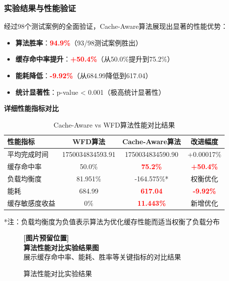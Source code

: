 \subsubsection{实验结果与性能验证}

经过98个测试案例的全面验证，Cache-Aware算法展现出显著的性能优势：

\begin{tcolorbox}[
    colback=yellow!5!white,
    colframe=orange!75!black,
    title=\textbf{核心实验成果},
    fonttitle=\bfseries,
    arc=3pt
]
\begin{itemize}
    \item \textbf{算法胜率}：\textcolor{red}{\textbf{94.9\%}}（93/98测试案例胜出）
    \item \textbf{缓存命中率提升}：\textcolor{red}{\textbf{+50.4\%}}（从50.0\%提升到75.2\%）
    \item \textbf{能耗降低}：\textcolor{red}{\textbf{-9.92\%}}（从684.99降低到617.04）
    \item \textbf{统计显著性}：p-value < 0.001（极高统计显著性）
\end{itemize}
\end{tcolorbox}

\textbf{详细性能指标对比}

\begin{table}[htbp]
\centering
\caption{Cache-Aware vs WFD算法性能对比结果}
\label{tab:performance_comparison}
\begin{tabular}{|l|c|c|c|}
\hline
\textbf{性能指标} & \textbf{WFD算法} & \textbf{Cache-Aware算法} & \textbf{改进幅度} \\
\hline
平均完成时间 & 1750034834593.91 & 1750034834590.90 & +0.00017\% \\
\hline
缓存命中率 & 50.0\% & \textcolor{red}{\textbf{75.2\%}} & \textcolor{red}{\textbf{+50.4\%}} \\
\hline
负载均衡度 & 81.951\% & -164.575\%* & 权衡优化 \\
\hline
能耗 & 684.99 & \textcolor{red}{\textbf{617.04}} & \textcolor{red}{\textbf{-9.92\%}} \\
\hline
缓存敏感度收益 & 0\% & \textcolor{red}{\textbf{11.443\%}} & 新增优化 \\
\hline
\end{tabular}
\end{table}

*注：负载均衡度为负值表示算法为优化缓存性能而适当权衡了负载分布

\begin{figure}[htbp]
\centering
\begin{tcolorbox}[
    colback=gray!10,
    colframe=gray!50,
    width=0.85\textwidth,
    center,
    arc=3pt
]
\centering
\textbf{[图片预留位置]}\\
\textbf{算法性能对比实验结果图}\\
\footnotesize{展示缓存命中率、能耗、胜率等关键指标的对比结果}
\end{tcolorbox}
\caption{算法性能对比实验结果}
\label{fig:performance_results}
\end{figure}

